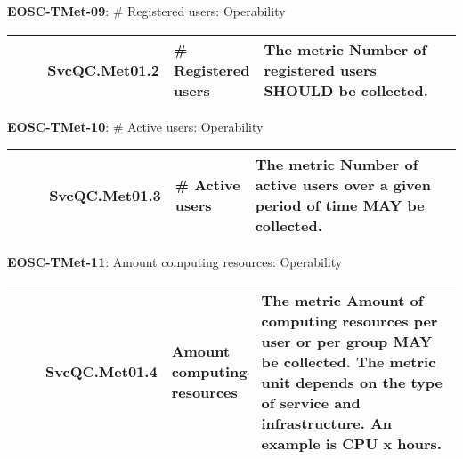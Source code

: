 \textbf{EOSC-TMet-09}: \# Registered users: Operability
\nopagebreak[4]
\begin{center}
    \tabletail{\hline}
    \tiny
    \begin{supertabular}{|p{0.10\linewidth}|p{0.10\linewidth}|p{0.20\linewidth}|p{0.60\linewidth}|} \hline
        \cite{orviz_fernandez_eosc-synergy_2020} & SvcQC.Met01.2 & \# Registered users & The metric Number of registered users SHOULD be collected.\\ \hline
    \end{supertabular}
\end{center}

\textbf{EOSC-TMet-10}: \# Active users: Operability
\nopagebreak[4]
\begin{center}
    \tabletail{\hline}
    \tiny
    \begin{supertabular}{|p{0.10\linewidth}|p{0.10\linewidth}|p{0.20\linewidth}|p{0.60\linewidth}|} \hline
        \cite{orviz_fernandez_eosc-synergy_2020} & SvcQC.Met01.3 & \# Active users & The metric Number of active users over a given period of time MAY be collected.\\ \hline
    \end{supertabular}
\end{center}

\textbf{EOSC-TMet-11}: Amount computing resources: Operability
\nopagebreak[4]
\begin{center}
    \tabletail{\hline}
    \tiny
    \begin{supertabular}{|p{0.10\linewidth}|p{0.10\linewidth}|p{0.20\linewidth}|p{0.60\linewidth}|} \hline
        \cite{orviz_fernandez_eosc-synergy_2020} & SvcQC.Met01.4 & Amount computing resources & The metric Amount of computing resources per user or per group MAY be collected. The metric unit depends on the type of service and infrastructure. An example is CPU x hours.\\ \hline
    \end{supertabular}
\end{center}

